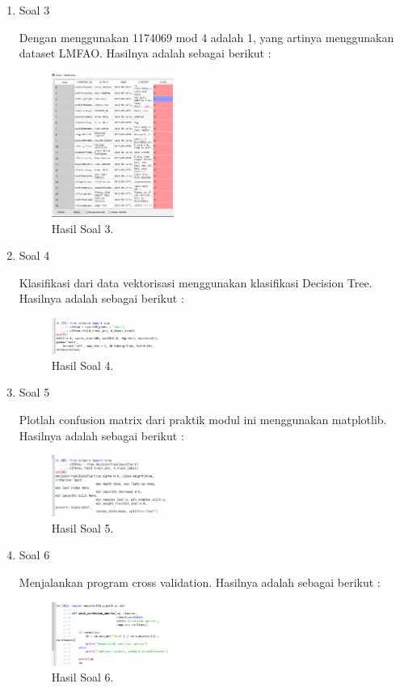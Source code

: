\begin{enumerate}
	\item Soal 3
	\hfill\break
	
	Dengan menggunakan 1174069 mod 4 adalah 1, yang artinya menggunakan dataset LMFAO. Hasilnya adalah sebagai berikut :
	\begin{figure}[H]
	\centering
		\includegraphics[width=4cm]{figures/1174071/4/materi/hasil31.PNG}
		\caption{Hasil Soal 3.}
	\end{figure}

	\item Soal 4
	\hfill\break
	
	Klasifikasi dari data vektorisasi menggunakan klasifikasi Decision Tree. Hasilnya adalah sebagai berikut :
	\begin{figure}[H]
	\centering
		\includegraphics[width=4cm]{figures/1174071/4/materi/hasil4.PNG}
		\caption{Hasil Soal 4.}
	\end{figure}

	\item Soal 5
	\hfill\break
	
	Plotlah confusion matrix dari praktik modul ini menggunakan matplotlib. Hasilnya adalah sebagai berikut :
	\begin{figure}[H]
	\centering
		\includegraphics[width=4cm]{figures/1174071/4/materi/hasil5.PNG}
		\caption{Hasil Soal 5.}
	\end{figure}

	\item Soal 6
	\hfill\break
	
	Menjalankan program cross validation. Hasilnya adalah sebagai berikut :
	\begin{figure}[H]
	\centering
		\includegraphics[width=4cm]{figures/1174071/4/materi/hasil6.PNG}
		\caption{Hasil Soal 6.}
	\end{figure}


\end{enumerate}
